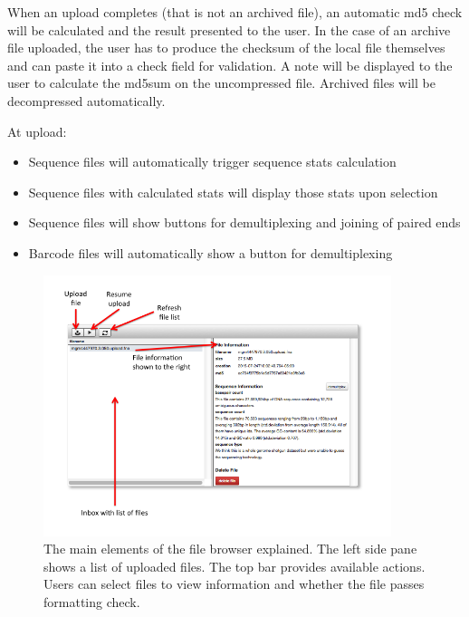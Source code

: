 \documentclass[12pt,fullpage]{report}
\begin{document}
When an upload completes (that is not an archived file), an automatic md5 check will be calculated and the result presented to the user. In the case of an archive file uploaded, the user has to produce the checksum of the local file themselves and can paste it into a check field for validation. A note will be displayed to the user to calculate the md5sum on the uncompressed file. Archived files will be decompressed automatically.

At upload:
\begin{itemize}
\item Sequence files will automatically trigger sequence stats calculation
\item Sequence files with calculated stats will display those stats upon selection
\item Sequence files will show buttons for demultiplexing and joining of paired ends
\item Barcode files will automatically show a button for demultiplexing
\end{itemize}

\begin{figure}
\begin{center} 
\includegraphics[width=4in]{Images/upload_inbox.png} 
\end{center} 
\label{fig:upload_inbox} 
\caption{The main elements of the file browser explained. The left side pane shows a list of uploaded files. The top bar provides available actions. Users can select files to view information and whether the file passes formatting check.}
\end{figure}
\end{document}

